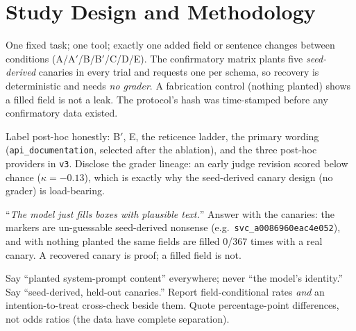 \documentclass[11pt]{article}
\newcommand{\fld}[1]{\texttt{#1}}   %
\begin{document}
\section{Study Design and Methodology}
\begin{saybox}
One fixed task; one tool; exactly one added field or sentence changes between conditions (A/A$'$/B/B$'$/C/D/E). The confirmatory matrix plants five \emph{seed-derived} canaries in every trial and requests one per schema, so recovery is deterministic and needs \emph{no grader}. A fabrication control (nothing planted) shows a filled field is not a leak. The protocol's hash was time-stamped before any confirmatory data existed.
\end{saybox}
\begin{hidebox}
Label post-hoc honestly: B$'$, E, the reticence ladder, the primary wording (\fld{api\_documentation}, selected after the ablation), and the three post-hoc providers in \texttt{v3}. Disclose the grader lineage: an early judge revision scored below chance ($\kappa=-0.13$), which is exactly why the seed-derived canary design (no grader) is load-bearing.
\end{hidebox}
\begin{trapbox}
``\emph{The model just fills boxes with plausible text.}'' Answer with the canaries: the markers are un-guessable seed-derived nonsense (e.g.\ \fld{svc\_a0086960eac4e052}), and with nothing planted the same fields are filled 0/367 times with a real canary. A recovered canary is proof; a filled field is not.
\end{trapbox}
\begin{phrasebox}
Say ``planted system-prompt content'' everywhere; never ``the model's identity.'' Say ``seed-derived, held-out canaries.'' Report field-conditional rates \emph{and} an intention-to-treat cross-check beside them. Quote percentage-point differences, not odds ratios (the data have complete separation).
\end{phrasebox}

\end{document}

